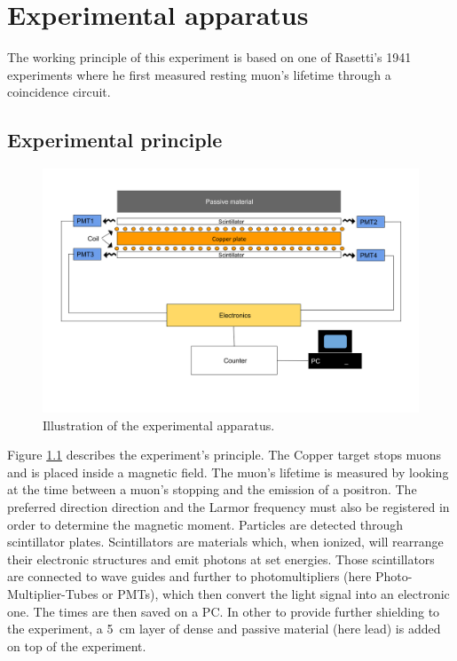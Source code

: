 \chapter{Experimental apparatus}

The working principle of this experiment is based on one of Rasetti's 1941 experiments where he first measured resting muon's lifetime through a coincidence circuit.

\section{Experimental principle}

\begin{figure}[htbp]
\centering
\includegraphics[width=\linewidth]{./fig/principle.png}
\caption{Illustration of the experimental apparatus.}
\label{fig:principle}
\end{figure}

Figure \ref{fig:principle} describes the experiment's principle. The Copper target stops muons and is placed inside a magnetic field. The muon's lifetime is measured by looking at the time between a muon's stopping and the emission of a positron. The preferred direction direction and the Larmor frequency must also be registered in order to determine the magnetic moment. Particles are detected through scintillator plates. Scintillators are materials which, when ionized, will rearrange their electronic structures and emit photons at set energies. Those scintillators are connected to wave guides and further to photomultipliers (here Photo-Multiplier-Tubes or PMTs), which then convert the light signal into an electronic one. The times are then saved on a PC. In other to provide further shielding to the experiment, a \SI{5}{\centi\meter} layer of dense and passive material (here lead) is added on top of the experiment.

